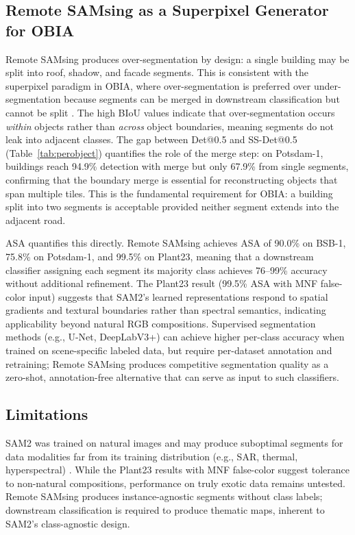 \documentclass[review,11pt,authoryear]{elsarticle}
\begin{document}
\subsection{Remote SAMsing as a Superpixel Generator for OBIA}
\label{sec:disc_obia}

Remote SAMsing produces over-segmentation by design: a single building may be split into roof, shadow, and facade segments. This is consistent with the superpixel paradigm in OBIA, where over-segmentation is preferred over under-segmentation because segments can be merged in downstream classification but cannot be split \citep{blaschke2010obia, benz2004ecognition, baatz2000multiresolution}. The high BIoU values indicate that over-segmentation occurs \textit{within} objects rather than \textit{across} object boundaries, meaning segments do not leak into adjacent classes. The gap between Det@0.5 and SS-Det@0.5 (Table~\ref{tab:perobject}) quantifies the role of the merge step: on Potsdam-1, buildings reach 94.9\% detection with merge but only 67.9\% from single segments, confirming that the boundary merge is essential for reconstructing objects that span multiple tiles. This is the fundamental requirement for OBIA: a building split into two segments is acceptable provided neither segment extends into the adjacent road.

ASA \citep{stutz2018superpixels} quantifies this directly. Remote SAMsing achieves ASA of 90.0\% on BSB-1, 75.8\% on Potsdam-1, and 99.5\% on Plant23, meaning that a downstream classifier assigning each segment its majority class achieves 76--99\% accuracy without additional refinement. The Plant23 result (99.5\% ASA with MNF false-color input) suggests that SAM2's learned representations respond to spatial gradients and textural boundaries rather than spectral semantics, indicating applicability beyond natural RGB compositions. Supervised segmentation methods (e.g., U-Net, DeepLabV3+) can achieve higher per-class accuracy when trained on scene-specific labeled data, but require per-dataset annotation and retraining; Remote SAMsing produces competitive segmentation quality as a zero-shot, annotation-free alternative that can serve as input to such classifiers.

\subsection{Limitations}
\label{sec:disc_limitations}

SAM2 was trained on natural images and may produce suboptimal segments for data modalities far from its training distribution (e.g., SAR, thermal, hyperspectral) \citep{zhang2025sam2survey}. While the Plant23 results with MNF false-color suggest tolerance to non-natural compositions, performance on truly exotic data remains untested. Remote SAMsing produces instance-agnostic segments without class labels; downstream classification is required to produce thematic maps, inherent to SAM2's class-agnostic design.
\end{document}
